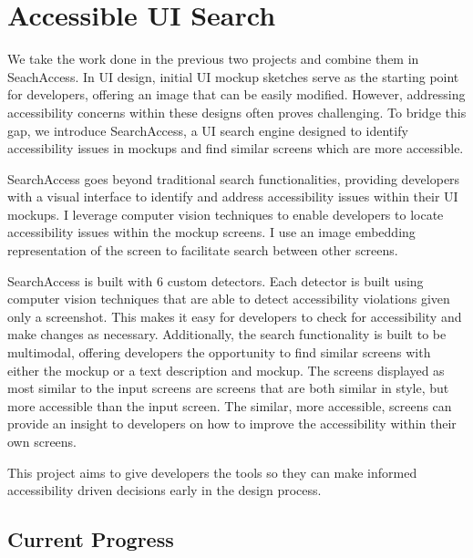 \newpage
\section{Accessible UI Search}
\label{sec:SearchAcces}
We take the work done in the previous two projects and combine them in SeachAccess. 
In UI design, initial UI mockup sketches serve as the starting point for developers, offering an image that can be easily modified. However, addressing accessibility concerns within these designs often proves challenging. To bridge this gap, we introduce SearchAccess, a UI search engine designed to identify accessibility issues in mockups and find similar screens which are more accessible.

SearchAccess goes beyond traditional search functionalities, providing developers with a visual interface to identify and address accessibility issues within their UI mockups. I leverage computer vision techniques to enable developers to locate accessibility issues within the mockup screens. I use an image embedding representation of the screen to facilitate search between other screens.  

SearchAccess is built with 6 custom detectors. Each detector is built using computer vision techniques that are able to detect accessibility violations given only a screenshot. This makes it easy for developers to check for accessibility and make changes as necessary. Additionally, the search functionality is built to be multimodal, offering developers the opportunity to find similar screens with either the mockup or a text description and mockup. The screens displayed as most similar to the input screens are screens that are both similar in style, but more accessible than the input screen. The similar, more accessible, screens can provide an insight to developers on how to improve the accessibility within their own screens. 

This project aims to give developers the tools so they can make informed accessibility driven decisions early in the design process. 

\subsection{Current Progress}

